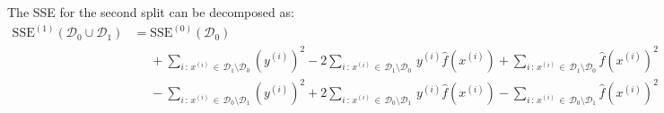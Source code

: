 \documentclass[a4paper, 11pt]{article}
\begin{document}
The SSE for the second split can be decomposed as:
\begin{align}
\text{SSE}^{(1)}\left(\mathcal{D}_0 \cup \mathcal{D}_1\right) &= \text{SSE}^{(0)}(\mathcal{D}_0) \nonumber \\
&\phantom{{}={}} + \sum_{i \,:\, x^{(i)} \, \in \, \mathcal{D}_1 \setminus \mathcal{D}_0} \left(y^{(i)}\right)^2 - 2 \sum_{i \,:\, x^{(i)} \, \in \, \mathcal{D}_1 \setminus \mathcal{D}_0} \,y^{(i)} \hat{f}\left(x^{(i)}\right) + \sum_{i \,:\, x^{(i)} \, \in \, \mathcal{D}_1 \setminus \mathcal{D}_0} \hat{f}\left(x^{(i)}\right)^2 \nonumber \\
&\phantom{{}={}} - \sum_{i \,:\, x^{(i)} \, \in \, \mathcal{D}_0 \setminus \mathcal{D}_1} \left(y^{(i)}\right)^2 + 2 \sum_{i \,:\, x^{(i)} \, \in \, \mathcal{D}_0 \setminus \mathcal{D}_1} \,y^{(i)} \hat{f}\left(x^{(i)}\right) - \sum_{i \,:\, x^{(i)} \, \in \, \mathcal{D}_0 \setminus \mathcal{D}_1} \hat{f}\left(x^{(i)}\right)^2 \label{eq:SSE_update}
\end{align}




\end{document}
